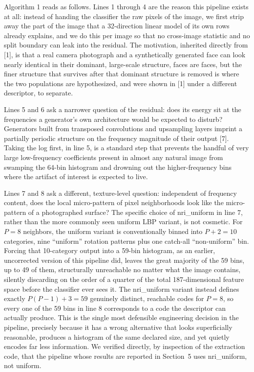 \documentclass[11pt]{article}
\begin{document}
\vspace{0.5em}
Algorithm 1 reads as follows. Lines 1 through 4 are the reason this pipeline exists at all: instead of handing the classifier the raw pixels of the image, we first strip away the part of the image that a 32-direction linear model of its own rows already explains, and we do this per image so that no cross-image statistic and no split boundary can leak into the residual. The motivation, inherited directly from [1], is that a real camera photograph and a synthetically generated face can look nearly identical in their dominant, large-scale structure, faces are faces, but the finer structure that survives after that dominant structure is removed is where the two populations are hypothesized, and were shown in [1] under a different descriptor, to separate.

Lines 5 and 6 ask a narrower question of the residual: does its energy sit at the frequencies a generator's own architecture would be expected to disturb? Generators built from transposed convolutions and upsampling layers imprint a partially periodic structure on the frequency magnitude of their output [7]. Taking the log first, in line 5, is a standard step that prevents the handful of very large low-frequency coefficients present in almost any natural image from swamping the 64-bin histogram and drowning out the higher-frequency bins where the artifact of interest is expected to live.

Lines 7 and 8 ask a different, texture-level question: independent of frequency content, does the local micro-pattern of pixel neighborhoods look like the micro-pattern of a photographed surface? The specific choice of nri\_uniform in line 7, rather than the more commonly seen uniform LBP variant, is not cosmetic. For $P=8$ neighbors, the uniform variant is conventionally binned into $P+2=10$ categories, nine ``uniform'' rotation patterns plus one catch-all ``non-uniform'' bin. Forcing that 10-category output into a 59-bin histogram, as an earlier, uncorrected version of this pipeline did, leaves the great majority of the 59 bins, up to 49 of them, structurally unreachable no matter what the image contains, silently discarding on the order of a quarter of the total 187-dimensional feature space before the classifier ever sees it. The nri\_uniform variant instead defines exactly $P(P-1)+3=59$ genuinely distinct, reachable codes for $P=8$, so every one of the 59 bins in line 8 corresponds to a code the descriptor can actually produce. This is the single most defensible engineering decision in the pipeline, precisely because it has a wrong alternative that looks superficially reasonable, produces a histogram of the same declared size, and yet quietly encodes far less information. We verified directly, by inspection of the extraction code, that the pipeline whose results are reported in Section~5 uses nri\_uniform, not uniform.
\end{document}
